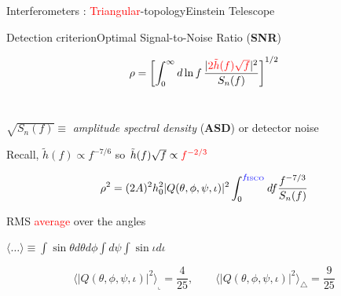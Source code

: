 \documentclass[xcolor=dvipsnames,t]{beamer}
\newcommand{\red}[1]{\textcolor{red}{#1}}
\newcommand{\bl}[1]{\textcolor{blue}{#1}}
\newcommand{\f}{\frac}
\begin{document}
\begin{frame}{Interferometers : \red{Triangular}-topology}{Einstein Telescope}
{
  }

   
\end{frame}


\begin{frame}{Detection criterion}{Optimal Signal-to-Noise Ratio ({\bf SNR})}
  \vspace{-5mm}
  \begin{footnotesize} 
  \[
  \rho=\left[ \int_0^\infty d\ln f\, \f{|\red{2\tilde{h}(f)\sqrt{f}}|^2}{S_n(f)}\right]^{1/2} 
  \]
  \\
  \end{footnotesize}
  $\sqrt{S_n(f)}\equiv$ {\it amplitude spectral density} ({\bf ASD}) or  detector noise
  \\
  {
    \vspace{3mm}
    Recall, $\tilde{h}(f) \propto f^{-7/6}$ so $\tilde{h}(f) \sqrt{f} \propto \red{f^{-2/3}}$
    \begin{footnotesize} 
    \[
    \rho^2 =  (2A)^2 h_0^2 |Q(\theta,\phi,\psi,\iota)|^2 \int_0^{\bl{f_\text{ISCO}}} df \f{f^{-7/3}}{S_n(f)} 
    \]
    \end{footnotesize}
  }
  RMS \red{average} over the angles 
  \begin{small}
  $ \langle \ldots \rangle \equiv \int \sin\theta d\theta d\phi \int d\psi \int\sin\iota d\iota $
  \end{small}
  \begin{footnotesize} 
  \[
  \langle |Q(\theta,\phi,\psi,\iota)|^2 \rangle_\llcorner = \f{4}{25}, \qquad \langle |Q(\theta,\phi,\psi,\iota)|^2 \rangle_\triangle = \f{9}{25}
  \]
  \end{footnotesize}
\end{frame}
\end{document}
